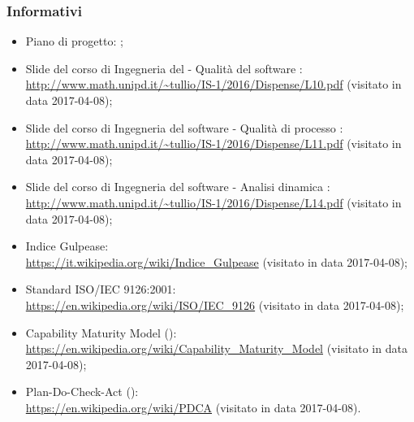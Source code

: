 \documentclass[PianoDiQualifica.tex]{subfiles}
\begin{document}
		\subsubsection{Informativi}
			\begin{itemize}
				\item Piano di progetto: \PPdoc{};
				\item Slide del corso di Ingegneria del  - Qualità del software : \\
				\url{http://www.math.unipd.it/~tullio/IS-1/2016/Dispense/L10.pdf} (visitato in data 2017-04-08);
				\item Slide del corso di Ingegneria del software - Qualità di processo : \\
				\url{http://www.math.unipd.it/~tullio/IS-1/2016/Dispense/L11.pdf} (visitato in data 2017-04-08);
				\item Slide del corso di Ingegneria del software - Analisi dinamica : \\
				\url{http://www.math.unipd.it/~tullio/IS-1/2016/Dispense/L14.pdf} (visitato in data 2017-04-08);
				\item Indice Gulpease: \\
				\url{https://it.wikipedia.org/wiki/Indice_Gulpease} (visitato in data 2017-04-08);
				\item Standard ISO/IEC 9126:2001: \\
				\url{https://en.wikipedia.org/wiki/ISO/IEC_9126} (visitato in data 2017-04-08);
				\item Capability Maturity Model (): \\
				\url{https://en.wikipedia.org/wiki/Capability_Maturity_Model} (visitato in data 2017-04-08);
				\item Plan-Do-Check-Act (): \\
				\url{https://en.wikipedia.org/wiki/PDCA} (visitato in data 2017-04-08).
			\end{itemize}
			
\end{document}

